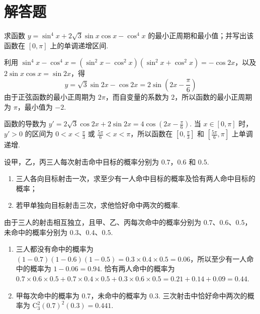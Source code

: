 \section{解答题}
\begin{problem}
求函数 \( y = \sin^4 x + 2\sqrt{3}\sin x\cos x - \cos^4 x \) 的最小正周期和最小值；并写出该函数在 \([0, \pi]\) 上的单调递增区间.
\end{problem}

\begin{solution}
利用 \(\sin^4x-\cos^4x=(\sin^2x-\cos^2x)(\sin^2x+\cos^2x)=-\cos2x\)，以及 \(2\sin x\cos x=\sin2x\)，得
\[
y=\sqrt{3}\sin2x-\cos2x=2\sin\left(2x-\frac{\pi}{6}\right)
\]
由于正弦函数的最小正周期为 \(2\pi\)，而自变量的系数为 \(2\)，所以函数的最小正周期为 \(\pi\)，最小值为 \(-2\).

函数的导数为 \(y'=2\sqrt{3}\cos2x+2\sin2x=4\cos\left(2x-\frac{\pi}{6}\right)\). 当 \(x\in[0,\pi]\) 时，\(y'>0\) 的区间为 \(0<x<\frac{\pi}{3}\) 或 \(\frac{5\pi}{6}<x<\pi\)，所以函数在 \([0,\frac{\pi}{3}]\) 和 \([\frac{5\pi}{6},\pi]\) 上单调递增.
\end{solution}

\begin{problem}
设甲，乙，丙三人每次射击命中目标的概率分别为 \(0.7\)，\(0.6\) 和 \(0.5\).

\begin{enumerate}
\item 三人各向目标射击一次，求至少有一人命中目标的概率及恰有两人命中目标的概率；
\item 若甲单独向目标射击三次，求他恰好命中两次的概率.
\end{enumerate}
\end{problem}

\begin{solution}
由于三人的射击相互独立，且甲、乙、丙每次命中的概率分别为 \(0.7\)、\(0.6\)、\(0.5\)，未命中的概率分别为 \(0.3\)、\(0.4\)、\(0.5\).

\begin{enumerate}
\item 三人都没有命中的概率为 \((1-0.7)(1-0.6)(1-0.5)=0.3\times0.4\times0.5=0.06\)，所以至少有一人命中的概率为 \(1-0.06=0.94\). 恰有两人命中的概率为
\(0.7\times0.6\times0.5+0.7\times0.4\times0.5+0.3\times0.6\times0.5=0.21+0.14+0.09=0.44\).
\item 甲每次命中的概率为 \(0.7\)，未命中的概率为 \(0.3\). 三次射击中恰好命中两次的概率为 \(\mathrm C_3^2(0.7)^2(0.3)=0.441\).
\end{enumerate}
\end{solution}


